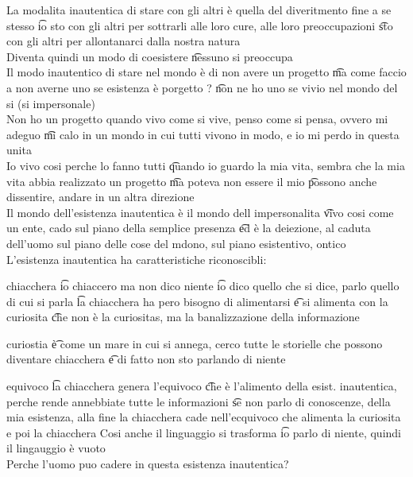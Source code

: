 \documentclass[12pt]{article}
\begin{document}
La modalita inautentica di stare con gli altri è quella del diveritmento fine a se stesso \t io sto con gli altri per sottrarli alle loro cure, alle loro preoccupazioni \t sto con gli altri per allontanarci dalla nostra natura \\
Diventa quindi un modo di coesistere \t nessuno si preoccupa \\
Il modo inautentico di stare nel mondo è di non avere un progetto \t ma come faccio a non averne uno se esistenza è porgetto ? \t non ne ho uno se vivio nel mondo del si (si impersonale) \\
Non ho un progetto quando vivo come si vive, penso come si pensa, ovvero mi adeguo \t mi calo in un mondo in cui tutti vivono in modo, e io mi perdo in questa unita \\
Io vivo cosi perche lo fanno tutti \t quando io guardo la mia vita, sembra che la mia vita abbia realizzato un progetto \t ma poteva non essere il mio \t possono anche dissentire, andare in un altra direzione \\
Il mondo dell'esistenza inautentica è il mondo dell impersonalita \t vivo cosi come un ente, cado sul piano della semplice presenza \t ed è la deiezione, al caduta dell'uomo sul piano delle cose del mdono, sul piano esistentivo, ontico \\
L'esistenza inautentica ha caratteristiche riconoscibli:
\bi
    \item chiacchera \t io chiaccero ma non dico niente \t io dico quello che si dice, parlo quello di cui si parla \t la chiacchera ha pero bisogno di alimentarsi \t e si alimenta con la curiosita  \t che non è la curiositas, ma la banalizzazione della informazione
    \item curiostia \t è come un mare in cui si annega, cerco tutte le storielle che possono diventare chiacchera \t e di fatto non sto parlando di niente
    \item equivoco \t la chiacchera genera l'equivoco \t che è l'alimento della esist. inautentica, perche rende annebbiate tutte le informazioni \t se non parlo di conoscenze, della mia esistenza, alla fine la chiacchera cade nell'ecquivoco che alimenta la curiosita e poi la chiacchera
\ei
Cosi anche il linguaggio si trasforma \t io parlo di niente, quindi il lingauggio è vuoto  \\
Perche l'uomo puo cadere in questa esistenza inautentica?
\end{document}

